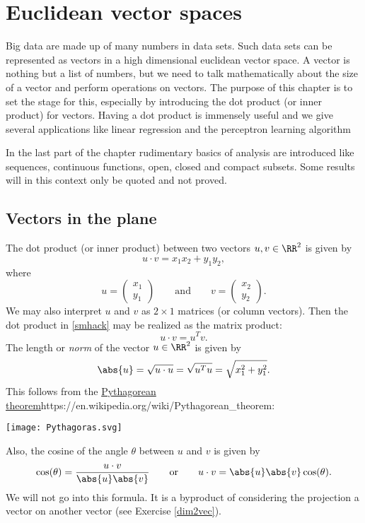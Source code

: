 \documentclass{article}
\begin{document}
\chapter{Euclidean vector spaces}

Big data are made up of many numbers in data sets. Such data sets can
be represented as vectors in a high dimensional euclidean vector
space. A vector is nothing but a list of numbers, but we need to talk
mathematically about the size of a vector and perform operations on
vectors. The purpose of this chapter is to set the stage for this,
especially by introducing the dot product (or inner product) for
vectors. Having a dot product is immensely useful and we give several
applications like linear regression and the perceptron learning algorithm

In the last part of the chapter rudimentary basics of analysis
are introduced like sequences, continuous functions, open, closed
and compact subsets. Some results will in this context only
be quoted and not proved.


\section{Vectors in the plane}

The dot product (or inner product) between two vectors $u, v\in \RR^2$ is
given by
\begin{equation}\label{smhack}
u\cdot v = x_1 x_2 + y_1 y_2,
\end{equation}
where
\begin{equation}
u = \begin{pmatrix} x_1 \\ y_1 \end{pmatrix}\qquad\text{and}\qquad
v = \begin{pmatrix} x_2 \\ y_2 \end{pmatrix}.
\end{equation}
We may also interpret
$u$ and $v$  as $2\times 1$ matrices (or column vectors).
Then the dot product in
\eqref{smhack} may be realized as the matrix product:
$$
u\cdot v = u^T v.
$$
The length or \emph{norm} of the vector $u\in \RR^2$ is given by
$$
\abs{u} = \sqrt{u\cdot u} = \sqrt{u^T u} = \sqrt{x_1^2 + y_1^2}.
$$
This follows from the \url{Pythagorean theorem}{https://en.wikipedia.org/wiki/Pythagorean_theorem}:

\texttt{[image: Pythagoras.svg]}


Also, the cosine of the angle $\theta$ between $u$ and $v$ is given by
$$
\cos(\theta) = \frac{u\cdot v}{\abs{u}\abs{v}}\qquad\text{or}\qquad u \cdot v = \abs{u} \abs{v} \cos(\theta).
$$
We will not go into this formula. It is a byproduct of considering the projection a vector on
another vector (see Exercise \ref{dim2vec}).
\end{document}
